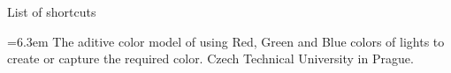 \app List of shortcuts

\medskip
\bgroup \leftskip=6.3em
\abbrv[RGB]  The aditive color model of using Red, Green and Blue colors of lights to create or capture the required color.
\abbrv[CTU]  Czech Technical University in Prague.
\par\egroup
